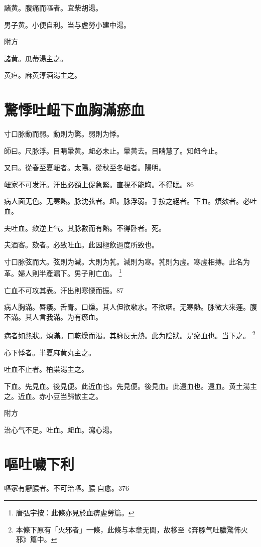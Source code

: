 諸黄。腹痛而嘔者。宜柴胡湯。

男子黄。小便自利。当与虗勞小建中湯。

附方

諸黄。瓜蒂湯主之。

黄疸。麻黄淳酒湯主之。

\chapter{驚悸吐衄下血胸滿瘀血}

寸口脉動而弱。動則为驚。弱則为悸。

師曰。尺脉浮。目睛暈黄。衄必未止。暈黄去。目睛慧了。知衄今止。

又曰。從春至夏衄者。太陽。從秋至冬衄者。陽明。

衄家不可发汗。汗出必額上促急緊。直視不能眴。不得眠。86

病人面无色。无寒熱。脉沈弦者。衄。{\khaai 脉}浮弱。手按之絕者。下血。煩欬者。必吐血。

夫吐血。欬逆上气。其脉數而有熱。不得卧者。死。

夫酒客。欬者。必致吐血。此因極飲過度所致也。

寸口脉弦而大。弦則为減。大則为芤。減則为寒。芤則为虗。寒虗相摶。此名为革。婦人則半產漏下。男子則亡血。
	\footnote{
		唐弘宇按：此條亦見於血痹虗勞篇。
	}

亡血不可攻其表。汗出則寒慄而振。87

病人胸滿。唇痿。舌青。口燥。其人但欲嗽水。不欲咽。无寒熱。脉微大來遲。腹不滿。其人言我滿。为有瘀血。

病者如熱狀。煩滿。口乾燥而渴。其脉反无熱。此为陰狀。是瘀血也。当下之。
	\footnote{
		本條下原有「火邪者」一條，此條与本章无関，故移至《奔豚气吐膿驚怖火邪》篇中。
	}

心下悸者。半夏麻黄丸主之。

吐血不止者。柏枼湯主之。

下血。先見血。後見便。此近血也。先見便。後見血。此遠血也。遠血。黄土湯主之。近血。赤小豆当歸散主之。

附方

治心气不足。吐血。衄血。瀉心湯。

\chapter{嘔吐噦下利}

嘔家有癰膿者。不可治嘔。膿{\sungii 𥁞}自愈。376

